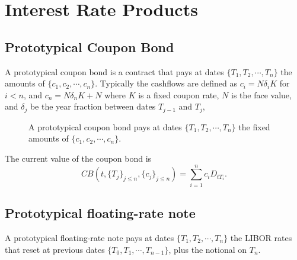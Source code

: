 \chapter{Interest Rate Products}

\section{Prototypical Coupon Bond}
A prototypical coupon bond is a contract that pays at dates 
$\{T_1,T_2,\cdots,T_{n}\}$ the amounts of $\{c_1,c_2,\cdots,c_n\}$. Typically
the cashflows are defined as $c_i=N\delta_i K$ for $i<n$, and 
$c_n=N\delta_n K+N$ where $K$ is a fixed coupon rate, $N$ is the face value,
and $\delta_j$ be the year fraction between dates $T_{j-1}$ and $T_{j}$,

\begin{figure}
  \caption{A prototypical coupon bond pays at dates
           $\{T_1,T_2,\cdots,T_{n}\}$ the fixed amounts of 
           $\{c_1,c_2,\cdots,c_n\}$.}
\end{figure}

The current value of the coupon bond is
\begin{equation}
  CB(t,\{T_j\}_{j\le n},\{c_j\}_{j\le n}) = \sum_{i=1}^n c_i D_{tT_i}.
\end{equation}

\section{Prototypical floating-rate note}
A prototypical floating-rate note pays at dates
$\{T_1,T_2,\cdots,T_{n}\}$ the LIBOR rates that reset at previous dates
$\{T_0,T_1,\cdots,T_{n-1}\}$, plus the notional on $T_n$. 

